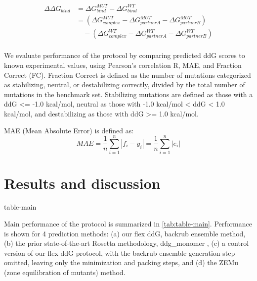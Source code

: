 \begin{equation}\label{split-ddg-equation}
  \begin{split}
    {\Delta\Delta}G_{bind} & ={\Delta}G^{MUT}_{bind} - {\Delta}G^{WT}_{bind}\\
    & =({\Delta}G^{MUT}_{complex} - {\Delta}G^{MUT}_{partner A} - {\Delta}G^{MUT}_{partner B})\\
    & \quad - ({\Delta}G^{WT}_{complex} - {\Delta}G^{WT}_{partner A} - {\Delta}G^{WT}_{partner B})\\
  \end{split}
\end{equation}

We evaluate performance of the protocol by comparing predicted ddG scores to known experimental values, using Pearson’s correlation R, MAE, and Fraction Correct (FC). Fraction Correct is defined as the number of mutations categorized as stabilizing, neutral, or destabilizing correctly, divided by the total number of mutations in the benchmark set. Stabilizing mutations are defined as those with a ddG <= -1.0 kcal/mol, neutral as those with -1.0 kcal/mol < ddG < 1.0 kcal/mol, and destabilizing as those with ddG >= 1.0 kcal/mol.

MAE (Mean Absolute Error) is defined as:
\begin{equation}\label{MAE-equation}
  MAE = \dfrac{1}{n}\sum\limits_{i=1}^n|f_i-y_i| = \dfrac{1}{n}\sum\limits_{i=1}^n|e_i|
\end{equation}

\section{Results and discussion}

{table-main}

Main performance of the protocol is summarized in \cref{tab:table-main}. Performance is shown for 4 prediction methods: (a) our flex ddG, backrub ensemble method, (b) the prior state-of-the-art Rosetta methodology, ddg\_monomer \cite{kellogg_role_ 2011}, (c) a control version of our flex ddG protocol, with the backrub ensemble generation step omitted, leaving only the minimization and packing steps, and (d) the ZEMu (zone equilibration of mutants) method\cite{dourado_multiscale_2014}.

